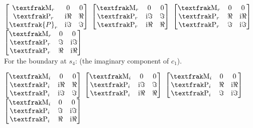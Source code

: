 \documentclass[preprint]{iucr}              %
\numberwithin{equation}{section}
\begin{document}
	$\begin{bmatrix}
		\Minus{}_r		& 0					& 0 \\
		\Plus{}_r		&  \textrm{i}\Re{}	& \Re{} \\
		\textfrak{P}_r	& \textrm{i}\Im{}	& \Im{}
	\end{bmatrix}$
	$\begin{bmatrix}
		\Minus{}_r	& 0 				& 0 \\
		\Plus{}_r	&\textrm{i}\Im{}	& \Im{} \\
		\Plus{}_r	& \textrm{i}\Re{}	& \Re{} \\
	\end{bmatrix}$ 
	$\begin{bmatrix}
		\label{thirdmatrix}
		\Minus{}_r	& 0			& 0 \\
		\Plus{}_r	&  \Re{}	& \textrm{i}\Re{} \\
		\Plus{}_r	& \Im{}		&\textrm{i}\Im{}
	\end{bmatrix}	$
	$\begin{bmatrix}
		\Minus{}_r	& 0			& 0 \\
		\Plus{}_r	& \Im{}		&\textrm{i}\Im{} \\
		\Plus{}_r	&  \Re{}	&\textrm{i}\Re{} \\
	\end{bmatrix}$ \\
	
	For the boundary at $s_4$: (the imaginary component of $c_1$).
	
	$\begin{bmatrix}
		\Minus{}_i	& 0					& 0 \\
		\Plus{}_i	&  \textrm{i}\Re{}	& \Re{} \\
		\Plus{}_i	& \textrm{i}\Im{}	& \Im{}
	\end{bmatrix}$
	$\begin{bmatrix}
		\Minus{}_i	& 0					& 0 \\
		\Plus{}_i	& \textrm{i}\Im{}	& \Im{} \\
		\Plus{}_i	&  \textrm{i}\Re{}	& \Re{} \\
	\end{bmatrix}$ 
	$\begin{bmatrix}
		\Minus{}_i	& 0			& 0 \\
		\Plus{}_i	&  \Re{}	& \textrm{i}\Re{} \\
		\Plus{}_i	& \Im{}		& \textrm{i}\Im{}
	\end{bmatrix}	$
	$\begin{bmatrix}
		\Minus{}_i	& 0		& 0 \\
		\Plus{}_i	& \Im{}	& \textrm{i}\Im{} \\
		\Plus{}_i	&  \Re{}& \textrm{i}\Re{} \\
	\end{bmatrix}$ \\
	
\end{document}
